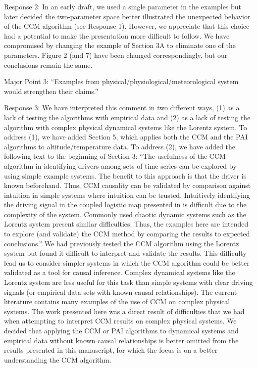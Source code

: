 \documentclass[]{article}
\begin{document}
Response 2: In an early draft, we used a single parameter in the examples but later decided the two-parameter space better illustrated the unexpected behavior of the CCM algorithm (see Response 1).  However, we appreciate that this choice had a potential to make the presentation more difficult to follow.  We have compromised by changing the example of Section 3A to eliminate one of the parameters.  Figure 2 (and 7) have been changed correspondingly, but our conclusions remain the same.

Major Point 3: ``Examples from physical/physiological/meteorological system would strengthen their claims.''

Response 3:  We have interpreted this comment in two different ways, (1) as a lack of testing the algorithms with empirical data and (2) as a lack of testing the algorithm with complex physical dynamical systems like the Lorentz system.  To address (1), we have added Section 5, which applies both the CCM and the PAI algorithms to altitude/temperature data.  To address (2), we have added the following text to the beginning of Section 3: ``The usefulness of the CCM algorithm in identifying drivers among sets of time series can be explored by using simple example systems.  The benefit to this approach is that the driver is known beforehand.  Thus, CCM causality can be validated by comparison against intuition in simple systems where intuition can be trusted.  Intuitively identifying the driving signal in the coupled logistic map presented in \cite{Sugihara2012} is difficult due to the complexity of the system.  Commonly used chaotic dynamic systems such as the Lorentz system present similar difficulties.  Thus, the examples here are intended to explore (and validate) the CCM method by comparing the results to expected conclusions.''  We had previously tested the CCM algorithm using the Lorentz system but found it difficult to interpret and validate the results.  This difficulty lead us to consider simpler systems in which the CCM algorithm could be better validated as a tool for causal inference.  Complex dynamical systems like the Lorentz system are less useful for this task than simple  systems with clear driving signals (or empirical data sets with known causal relationships).   The current literature contains many examples of the use of CCM on complex physical systems.  The work presented here was a direct result of difficulties that we had when attempting to interpret CCM results on complex physical systems.  We decided that applying the CCM or PAI algorithms to dynamical systems and empirical data without known causal relationships is better omitted from the results presented in this manuscript, for which the focus is on a better understanding the CCM algorithm.
\end{document}
